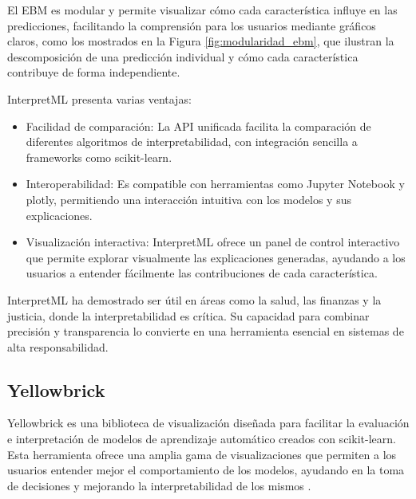 El EBM es modular y permite visualizar cómo cada característica influye en las predicciones, facilitando la comprensión para los usuarios mediante gráficos claros, como los mostrados en la Figura \ref{fig:modularidad_ebm}, que ilustran la descomposición de una predicción individual y cómo cada característica contribuye de forma independiente.

InterpretML presenta varias ventajas:
\begin{itemize}
    \item Facilidad de comparación: La API unificada facilita la comparación de diferentes algoritmos de interpretabilidad, con integración sencilla a frameworks como scikit-learn.
    \item Interoperabilidad: Es compatible con herramientas como Jupyter Notebook y plotly, permitiendo una interacción intuitiva con los modelos y sus explicaciones.
    \item Visualización interactiva: InterpretML ofrece un panel de control interactivo que permite explorar visualmente las explicaciones generadas, ayudando a los usuarios a entender fácilmente las contribuciones de cada característica.
\end{itemize}

InterpretML ha demostrado ser útil en áreas como la salud, las finanzas y la justicia, donde la interpretabilidad es crítica. Su capacidad para combinar precisión y transparencia lo convierte en una herramienta esencial en sistemas de alta responsabilidad.

\subsection{Yellowbrick}

Yellowbrick es una biblioteca de visualización diseñada para facilitar la evaluación e interpretación de modelos de aprendizaje automático creados con scikit-learn. Esta herramienta ofrece una amplia gama de visualizaciones que permiten a los usuarios entender mejor el comportamiento de los modelos, ayudando en la toma de decisiones y mejorando la interpretabilidad de los mismos \cite{bengfort_yellowbrick_2018}.

